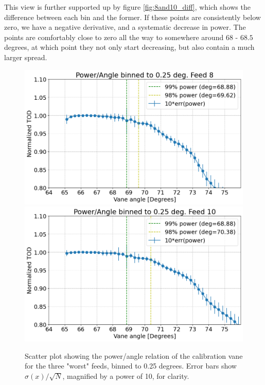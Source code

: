 \documentclass[10pt, a4paper]{article}
\begin{document}
This view is further supported up by figure \ref{fig:8and10_diff}, which shows the difference between each bin and the former. If these points are consistently below zero, we have a negative derivative, and a systematic decrease in power. The points are comfortably close to zero all the way to somewhere around $68$ - $68.5$ degrees, at which point they not only start decreasing, but also contain a much larger spread. 


\vspace{1cm}
\begin{figure}[H]
    \centering
    \includegraphics[scale=0.36]{../plots/binned8.png}
    \includegraphics[scale=0.36]{../plots/binned10.png}
    \caption{Scatter plot showing the power/angle relation of the calibration vane for the three "worst" feeds, binned to 0.25 degrees. Error bars show $\sigma(x)/\sqrt{N}$, magnified by a power of 10, for clarity.}
    \label{fig:8and10}
\end{figure}
\end{document}
